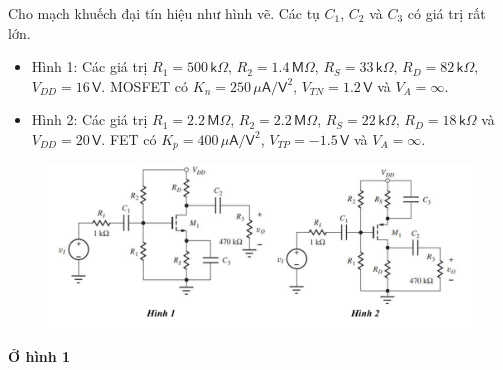 
Cho mạch khuếch đại tín hiệu như hình vẽ. Các tụ $C_{1}$, $C_{2}$ và $C_{3}$ có giá trị rất lớn.

\begin{itemize}[label=-]
	\item  Hình 1: Các giá trị $R_{1} = 500\,\textsf{k}\Omega$, $R_{2} = 1.4\,\textsf{M}\Omega$, $R_{S} = 33\,\textsf{k}\Omega$, $R_{D} = 82\,\textsf{k}\Omega$, $V_{DD} = 16\,\textsf{V}$. MOSFET có $K_{n} = 250\,\mu\textsf{A}/\textsf{V}^{2}$, $V_{TN} = 1.2\,\textsf{V}$ và $V_{A} = \infty$. 
	\item  Hình 2: Các giá trị $R_{1} = 2.2\,\textsf{M}\Omega$, $R_{2} = 2.2\,\textsf{M}\Omega$, $R_{S} = 22\,\textsf{k}\Omega$, $R_{D} = 18\,\textsf{k}\Omega$ và $V_{DD} = 20\,\textsf{V}$. FET có $K_{p} = 400\,\mu\textsf{A}/\textsf{V}^{2}$, $V_{TP} = -1.5\,\textsf{V}$ và $V_{A} = \infty$. 
\end{itemize}

\begin{figure}[H]
	\centering
	\includegraphics[width=\linewidth]{./my-chapters/my-images/Question1/debai.png}
\end{figure}

\begin{center}
	\textbf{Ở hình 1}
\end{center}


